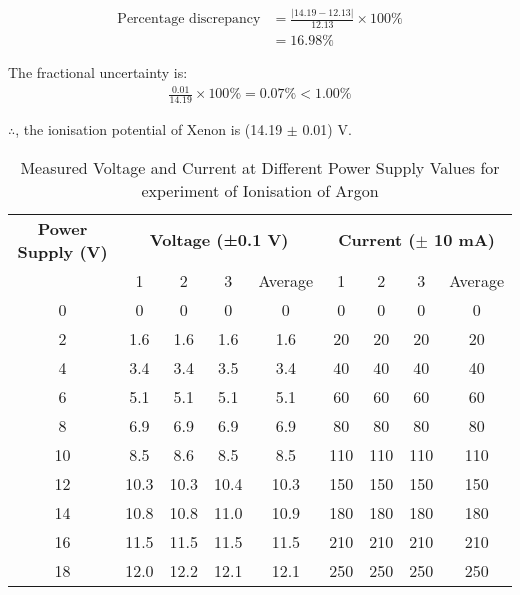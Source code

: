 \documentclass[a4paper,11pt]{article}
\begin{document}
\begin{align*}
\text{Percentage discrepancy}&= \frac{|14.19-12.13|}{12.13} \times 100\% \\
&=16.98 \%
\end{align*}

The fractional uncertainty is:
\begin{align*}
\frac{0.01}{14.19} \times 100 \% = 0.07 \%<1.00 \%
\end{align*}

$\therefore$, the ionisation potential of Xenon is (14.19 $\pm$ 0.01) V.


\newpage
\begin{table}[h!]
\small
\centering
\begin{tabular}{ccccccccc}
\toprule
\multicolumn{1}{c}{\textbf{Power Supply (V)}} & \multicolumn{4}{c}{\textbf{Voltage (±0.1 V)}} & \multicolumn{4}{c}{\textbf{Current ($\pm$ 10 mA)}} \\
\cmidrule(lr){2-5} \cmidrule(lr){6-9}
& 1 & 2 & 3 & Average & 1 & 2 & 3 & Average \\
\midrule
0  & 0   & 0   & 0   & 0   & 0  & 0  & 0  & 0  \\
2  & 1.6 & 1.6 & 1.6 & 1.6 & 20 & 20 & 20 & 20 \\
4  & 3.4 & 3.4 & 3.5 & 3.4 & 40 & 40 & 40 & 40 \\
6  & 5.1 & 5.1 & 5.1 & 5.1 & 60 & 60 & 60 & 60 \\
8  & 6.9 & 6.9 & 6.9 & 6.9 & 80 & 80 & 80 & 80 \\
10 & 8.5 & 8.6 & 8.5 & 8.5 & 110 & 110 & 110 & 110 \\
12 & 10.3 & 10.3 & 10.4 & 10.3 & 150 & 150 & 150 & 150 \\
14 & 10.8 & 10.8 & 11.0 & 10.9 & 180 & 180 & 180 & 180 \\
16 & 11.5 & 11.5 & 11.5 & 11.5 & 210 & 210 & 210 & 210 \\
18 & 12.0 & 12.2 & 12.1 & 12.1 & 250 & 250 & 250 & 250 \\
\bottomrule
\end{tabular}
\caption{Measured Voltage and Current at Different Power Supply Values for experiment of Ionisation of Argon}
\label{tab:measurements}
\end{table}
\end{document}
